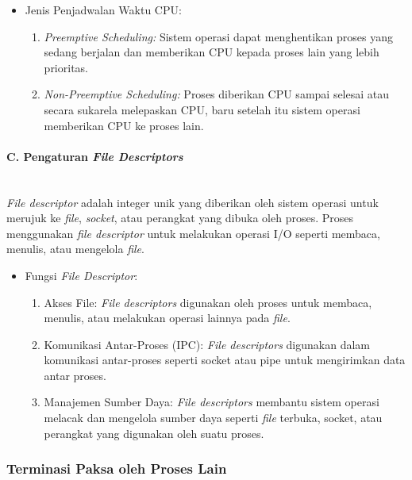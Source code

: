 \documentclass[12pt]{article}
\begin{document}
\begin{itemize}
    \begin{itemize}
        \item Jenis Penjadwalan Waktu CPU:
        \begin{enumerate}
            \item \textit{Preemptive Scheduling:} Sistem operasi dapat menghentikan proses yang sedang berjalan dan memberikan CPU kepada proses lain yang lebih prioritas.
            \item \textit{Non-Preemptive Scheduling:} Proses diberikan CPU sampai selesai atau secara sukarela melepaskan CPU, baru setelah itu sistem operasi memberikan CPU ke proses lain.
        \end{enumerate}
    \end{itemize}

    \paragraph{C. Pengaturan \textit{File Descriptors}} \mbox{} \\
    \textit{File descriptor} adalah integer unik yang diberikan oleh sistem operasi untuk merujuk ke \textit{file}, \textit{socket}, atau perangkat yang dibuka oleh proses. Proses menggunakan \textit{file descriptor} untuk melakukan operasi I/O seperti membaca, menulis, atau mengelola \textit{file}.

    \begin{itemize}
        \item Fungsi \textit{File Descriptor}:
        \begin{enumerate}
            \item {Akses File:}  \textit{File descriptors} digunakan oleh proses untuk membaca, menulis, atau melakukan operasi lainnya pada \textit{file}.
            \item Komunikasi Antar-Proses (IPC): \textit{File descriptors} digunakan dalam komunikasi antar-proses seperti socket atau pipe untuk mengirimkan data antar proses.
            \item Manajemen Sumber Daya: \textit{File descriptors} membantu sistem operasi melacak dan mengelola sumber daya seperti \textit{file} terbuka, socket, atau perangkat yang digunakan oleh suatu proses.
        \end{enumerate}
    \end{itemize}

    \subsubsection{Terminasi Paksa oleh Proses Lain}


\end{itemize}
\end{document}
